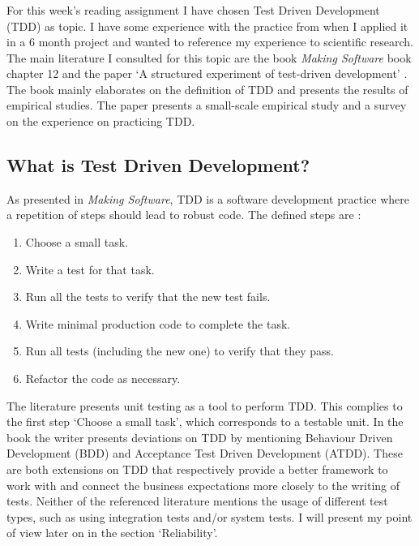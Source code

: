 \subsubsection*{}
For this week's reading assignment I have chosen Test Driven Development (TDD) as topic.
I have some experience with the practice from when I applied it in a 6 month project and wanted to reference my experience to scientific research.
The main literature I consulted for this topic are the book \textit{Making Software} \autocite{MAKING_SOFTWARE} book chapter 12 and the paper `A structured experiment of test-driven development' \autocite{SAC-J-2003-GeorgeW04}.
The book mainly elaborates on the definition of TDD and presents the results of empirical studies.
The paper presents a small-scale empirical study and a survey on the experience on practicing TDD.

\subsection*{What is Test Driven Development?}

As presented in \textit{Making Software}, TDD is a software development practice where a repetition of steps should lead to robust code.
The defined steps are \autocite[208]{MAKING_SOFTWARE}:

\begin{enumerate}
  \item Choose a small task.
  \item Write a test for that task.
  \item Run all the tests to verify that the new test fails.
  \item Write minimal production code to complete the task.
  \item Run all tests (including the new one) to verify that they pass.
  \item Refactor the code as necessary.
\end{enumerate}

The literature presents unit testing as a tool to perform TDD.
This complies to the first step `Choose a small task', which corresponds to a testable unit.
In the book the writer presents deviations on TDD by mentioning Behaviour Driven Development (BDD) and Acceptance Test Driven Development (ATDD).
These are both extensions on TDD that respectively provide a better framework to work with and connect the business expectations more closely to the writing of tests.
Neither of the referenced literature mentions the usage of different test types, such as using integration tests and/or system tests.
I will present my point of view later on in the section `Reliability'.


